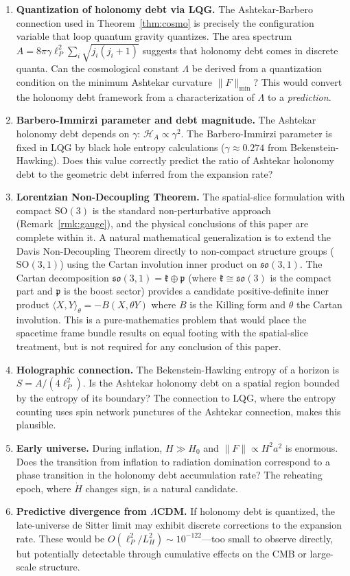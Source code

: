 \documentclass[12pt]{amsart}
\theoremstyle{definition}
\begin{document}
\begin{enumerate}
\item \textbf{Quantization of holonomy debt via LQG.}  The Ashtekar-Barbero connection used in Theorem~\ref{thm:cosmo} is precisely the configuration variable that loop quantum gravity quantizes.  The area spectrum $A = 8\pi\gamma\ell_P^2\sum_i\sqrt{j_i(j_i+1)}$ suggests that holonomy debt comes in discrete quanta.  Can the cosmological constant $\Lambda$ be derived from a quantization condition on the minimum Ashtekar curvature $\|F\|_{\min}$?  This would convert the holonomy debt framework from a characterization of $\Lambda$ to a \emph{prediction}.
\item \textbf{Barbero-Immirzi parameter and debt magnitude.}  The Ashtekar holonomy debt depends on $\gamma$: $\mathcal{H}_A \propto \gamma^2$.  The Barbero-Immirzi parameter is fixed in LQG by black hole entropy calculations ($\gamma \approx 0.274$ from Bekenstein-Hawking).  Does this value correctly predict the ratio of Ashtekar holonomy debt to the geometric debt inferred from the expansion rate?
\item \textbf{Lorentzian Non-Decoupling Theorem.}  The spatial-slice formulation with compact $\mathrm{SO}(3)$ is the standard non-perturbative approach (Remark~\ref{rmk:gauge}), and the physical conclusions of this paper are complete within it.  A natural mathematical generalization is to extend the Davis Non-Decoupling Theorem directly to non-compact structure groups ($\mathrm{SO}(3,1)$) using the Cartan involution inner product on $\mathfrak{so}(3,1)$.  The Cartan decomposition $\mathfrak{so}(3,1) = \mathfrak{k} \oplus \mathfrak{p}$ (where $\mathfrak{k} \cong \mathfrak{so}(3)$ is the compact part and $\mathfrak{p}$ is the boost sector) provides a candidate positive-definite inner product $\langle X, Y \rangle_\theta = -B(X, \theta Y)$ where $B$ is the Killing form and $\theta$ the Cartan involution.  This is a pure-mathematics problem that would place the spacetime frame bundle results on equal footing with the spatial-slice treatment, but is not required for any conclusion of this paper.
\item \textbf{Holographic connection.}  The Bekenstein-Hawking entropy of a horizon is $S = A/(4\ell_P^2)$.  Is the Ashtekar holonomy debt on a spatial region bounded by the entropy of its boundary?  The connection to LQG, where the entropy counting uses spin network punctures of the Ashtekar connection, makes this plausible.
\item \textbf{Early universe.}  During inflation, $H \gg H_0$ and $\|F\| \propto H^2 a^2$ is enormous.  Does the transition from inflation to radiation domination correspond to a phase transition in the holonomy debt accumulation rate?  The reheating epoch, where $\dot H$ changes sign, is a natural candidate.
\item \textbf{Predictive divergence from $\Lambda$CDM.}  If holonomy debt is quantized, the late-universe de Sitter limit may exhibit discrete corrections to the expansion rate.  These would be $O(\ell_P^2/L_H^2) \sim 10^{-122}$---too small to observe directly, but potentially detectable through cumulative effects on the CMB or large-scale structure.
\end{enumerate}
\end{document}
